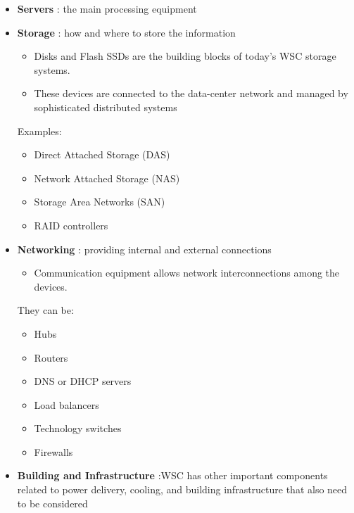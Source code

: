 \documentclass[10pt, oneside]{article}
\begin{document}
\begin{itemize}
    \item \color{green}\textbf{Servers}\color{black}
    : the main processing equipment
    
    \item \color{yellow}\textbf{Storage}\color{black}
    : how and where to store the information
    \begin{itemize}
        \item Disks and Flash SSDs are the building blocks of today’s WSC storage systems.
        \item These devices are connected to the data-center network and managed by sophisticated distributed systems
    \end{itemize} 
    Examples: 
    \begin{itemize}
        \item Direct Attached Storage (DAS)
        \item Network Attached Storage (NAS)
        \item Storage Area Networks (SAN)
        \item RAID controllers
    \end{itemize}
    \item \color{blue}\textbf{Networking}\color{black}
    : providing internal and external connections
    \begin{itemize}
        \item Communication equipment allows network interconnections among the devices.
    \end{itemize} 
    They can be: 
    \begin{itemize}
        \item Hubs
        \item Routers
        \item DNS or DHCP servers
        \item Load balancers
        \item Technology switches
        \item Firewalls
    \end{itemize}
    \item \color{red}\textbf{Building and Infrastructure}\color{black}
    :WSC has other important components related to power delivery, cooling, and building infrastructure that also need to be considered
\end{itemize}

\end{document}
